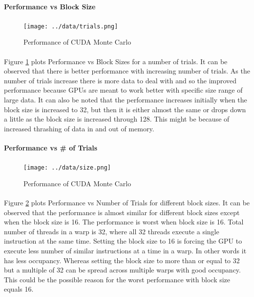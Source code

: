 \documentclass[notitlepage]{report}
\begin{document}
	\paragraph{Performance vs Block Size}
	\paragraph{}
	\begin{figure}[!ht]
		\texttt{[image: ../data/trials.png]}
		\caption{Performance of CUDA Monte Carlo}
		\label{fig:trials}
	\end{figure}
	\paragraph{} Figure \ref{fig:trials} plots Performance vs Block Sizes for a number of trials. It can be observed that there is better performance with increasing number of trials. As the number of trials increase there is more data to deal with and so the improved performance because GPUs are meant to work better with specific size range of large data. It can also be noted that the performance increases initially when the block size is increased to 32, but then it is either almost the same or drops down a little as the block size is increased through 128. This might be because of increased thrashing of data in and out of memory.
	
	\paragraph{Performance vs \# of Trials}
	\paragraph{}
	\begin{figure}[!ht]
		\texttt{[image: ../data/size.png]}
		\caption{Performance of CUDA Monte Carlo}
		\label{fig:size}
	\end{figure}
	\paragraph{} Figure \ref{fig:size} plots Performance vs Number of Trials for different block sizes. It can be observed that the performance is almost similar for different block sizes except when the block size is 16. The performance is worst when block size is 16. Total number of threads in a warp is 32, where all 32 threads execute a single instruction at the same time. Setting the block size to 16 is forcing the GPU to execute less number of similar instructions at a time in a warp. In other words it has less occupancy. Whereas setting the block size to more than or equal to 32 but a multiple of 32 can be spread across multiple warps with good occupancy. This could be the possible reason for the worst performance with block size equals 16.
	
\end{document}
